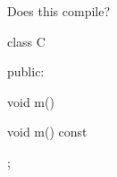 Does this compile?



\begin{consolethree}[escapeinside=||]

class C

{

public:

    void m()

    {}

    void m() const

    {}

};

\end{consolethree}

